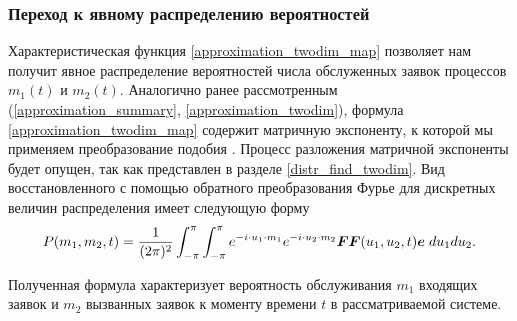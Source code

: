 \subsubsection{Переход к явному распределению вероятностей}
Характеристическая функция \eqref{approximation_twodim_map} позволяет нам получит явное распределение вероятностей числа обслуженных заявок процессов $m_{1}(t)$ и $m_{2}(t)$.
Аналогично ранее рассмотренным (\ref{approximation_summary}, \ref{approximation_twodim}), формула \eqref{approximation_twodim_map} содержит матричную экспоненту, к которой мы применяем преобразование подобия \cite{bronson1991matrix}. Процесс разложения матричной экспоненты будет опущен, так как представлен в разделе \ref{distr_find_twodim}.
Вид восстановленного с помощью обратного преобразования Фурье для дискретных величин распределения имеет следующую форму
\begin{equation}\label{distr_map_twodim}
	P(m_{1},m_{2},t) = \dfrac{1}{(2\pi)^2}\int_{-\pi}^{\pi}\int_{-\pi}^{\pi} e^{-i \cdot u_{1} \cdot m_{1}} e^{-i \cdot u_{2} \cdot m_{2}}\boldsymbol{FF}(u_{1},u_{2},t)\boldsymbol{e}\hspace{1mm}du_{1}du_{2}.
\end{equation}

Полученная формула характеризует вероятность обслуживания $m_{1}$ входящих заявок и $m_{2}$ вызванных заявок к моменту времени $t$ в рассматриваемой системе.
\clearpage